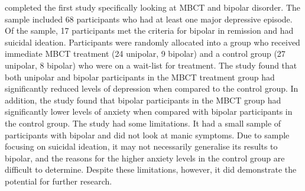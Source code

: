\citet{williams_mindfulness-based_2008} completed the first study specifically looking at MBCT and bipolar disorder. The sample included 68 participants who had at least one major depressive episode. Of the sample, 17 participants met the criteria for bipolar in remission and had suicidal ideation. Participants were randomly allocated into a group who received immediate MBCT treatment (24 unipolar, 9 bipolar) and a control group (27 unipolar, 8 bipolar) who were on a wait-list for treatment.
The study found that both unipolar and bipolar participants in the MBCT treatment group had significantly reduced levels of depression when compared to the control group. In addition, the study found that bipolar participants in the MBCT group had significantly lower levels of anxiety when compared with bipolar participants in the control group. The study had some limitations. It had a small sample of participants with bipolar and did not look at manic symptoms. Due to sample focusing on suicidal ideation, it may not necessarily generalise its results to bipolar, and the reasons for the higher anxiety levels in the control group are difficult to determine. Despite these limitations, however, it did demonstrate the potential for further research.
  